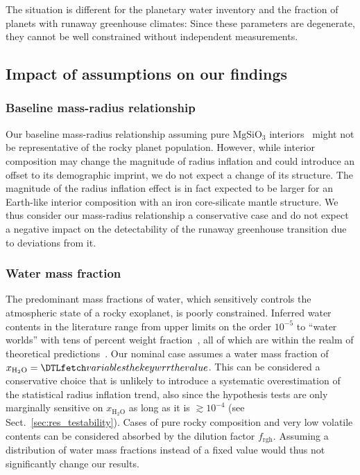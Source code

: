 \documentclass[modern]{aastex631}
\begin{document}
The situation is different for the planetary water inventory and the fraction of planets with runaway greenhouse climates:
Since these parameters are degenerate, they cannot be well constrained without independent measurements.


\subsection{Impact of assumptions on our findings}
\subsubsection{Baseline mass-radius relationship}
Our baseline mass-radius relationship assuming pure $\mathrm{MgSiO_3}$ interiors~\citep{Zeng2016} might not be representative of the rocky planet population.
However, while interior composition may change the magnitude of radius inflation and could introduce an offset to its demographic imprint, we do not expect a change of its structure.
The magnitude of the radius inflation effect is in fact expected to be larger for an Earth-like interior composition with an iron core-silicate mantle structure.
We thus consider our mass-radius relationship a conservative case and do not expect a negative impact on the detectability of the runaway greenhouse transition due to deviations from it.

\subsubsection{Water mass fraction}
The predominant mass fractions of water, which sensitively controls the atmospheric state of a rocky exoplanet, is poorly constrained.
Inferred water contents in the literature range from upper limits on the order $10^{-5}$ to ``water worlds'' with tens of percent weight fraction~\citep[e.g.,][]{Rogers2010,Unterborn2018,Mousis2020,Agol2021,Luque2022}, all of which are within the realm of theoretical predictions~\citep{Mulders2015b,Sato2016,Jin2018,Bitsch2019b,Venturini2020,Emsenhuber2021b,Schlecker2021}.
Our nominal case assumes a water mass fraction of $x_\mathrm{H_2O} = \var{wrr}$.
This can be considered a conservative choice that is unlikely to introduce a systematic overestimation of the statistical radius inflation trend, also since the hypothesis tests are only marginally sensitive on $x_\mathrm{H_2O}$ as long as it is $\gtrsim 10^{-4}$ (see Sect.~\ref{sec:res_testability}).
Cases of pure rocky composition and very low volatile contents can be considered absorbed by the dilution factor $f_\mathrm{rgh}$.
Assuming a distribution of water mass fractions instead of a fixed value would thus not significantly change our results.
\end{document}
